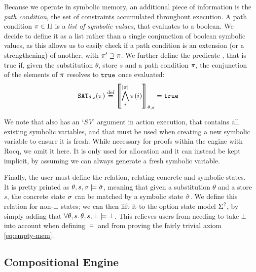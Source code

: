 Because we operate in symbolic memory, an additional piece of information is the \emph{path condition}, the set of constraints accumulated throughout execution. A path condition $\pi\in\Pi$ is a \emph{list of symbolic values}, that evaluates to a boolean. We decide to define it as a list rather than a single conjunction of boolean symbolic values, as this allows us to easily check if a path condition is an extension (or a strengthening) of another, with $\pi'\supseteq\pi$. We further define the predicate , that is true if, given the substitution $\theta$, store $s$ and a path condition $\pi$, the conjunction of the elements of $\pi$ resolves to $\texttt{true}$ once evaluated:
\begin{align*}
	\texttt{SAT}_{\mathit{\theta,s}}(\pi) \stackrel{\textnormal{def}}= \left\llbracket \bigwedge_{i}^{|\pi|}\pi(i) \right\rrbracket_{\theta,s} = \texttt{true}
\end{align*}

We note that \cite{cse2} also has an `\textit{SV}' argument in action execution, that contains all existing symbolic variables, and that must be used when creating a new symbolic variable to ensure it is fresh. While necessary for proofs within the engine with Rocq, we omit it here. It is only used for allocation and it can instead be kept implicit, by assuming we can always generate a fresh symbolic variable.

Finally, the user must define the  relation, relating concrete and symbolic states. It is pretty printed as $\theta,s,\sigma\models \hat{\sigma}$, meaning that given a substitution $\theta$ and a store $s$, the concrete state $\sigma$ can be matched by a symbolic state $\hat{\sigma}$. We define this relation for non-$\bot$ states; we can then lift it to the option state model $\Sigma^?$, by simply adding that $\forall \theta, s\ldotp \theta,s,\bot \models \bot$. This relieves users from needing to take $\bot$ into account when defining $\models$ and from proving the fairly trivial axiom \ref{eq:empty-mem}.

\subsection{Compositional Engine}

